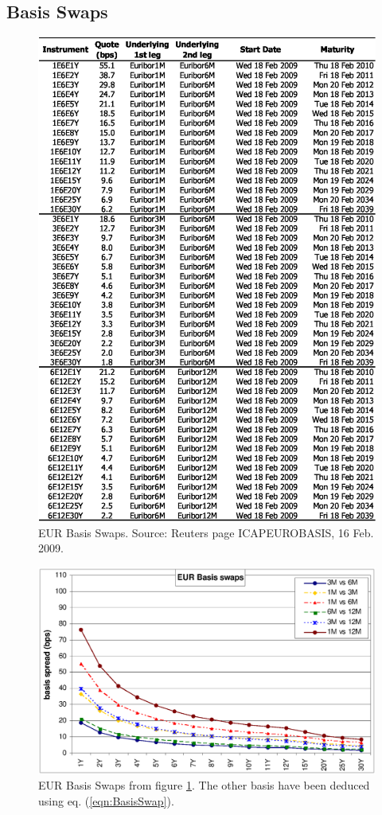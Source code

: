\documentclass[11pt,reqno]{amsart}
\begin{document}
\subsection{Basis Swaps}
\begin{figure}[tbp]
\centering
\includegraphics[scale=0.9]{./FigMktBasis}
\caption{EUR Basis Swaps. Source: Reuters page ICAPEUROBASIS, 16 Feb. 2009.}
\label{fig:BasisSwaps}
\end{figure}
\begin{figure}[tbp]
\centering
\includegraphics[scale=0.65]{./FigMktBasisGraph}
\caption{EUR Basis Swaps from figure \ref{fig:BasisSwaps}. The other basis have been deduced using eq. (\ref{eqn:BasisSwap}).}
\label{fig:BasisSwapsGraph}
\end{figure}
\end{document}
